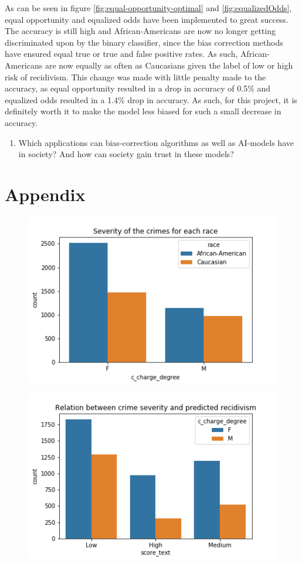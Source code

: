 \documentclass[11pt, fleqn, titlepage]{article}
\begin{document}
	As can be seen in figure \ref{fig:equal-opportunity-optimal} and \ref{fig:equalizedOdds}, equal opportunity and equalized odds have been implemented to great success. The accuracy is still high and African-Americans are now no longer getting discriminated upon by the binary classifier, since the bias correction methods have ensured equal true or true and false positive rates. As such, African-Americans are now equally as often as Caucasians given the label of low or high risk of recidivism. This change was made with little penalty made to the accuracy, as equal opportunity resulted in a drop in accuracy of 0.5\% and equalized odds resulted in a 1.4\% drop in accuracy. As such, for this project, it is definitely worth it to make the model less biased for such a small decrease in accuracy. 
	
	\begin{enumerate}	
		\item Which applications can bias-correction algorithms as well as AI-models have in society? And how can society gain trust in these models? 
	\end{enumerate}
	
	\section{Appendix} \label{appendix}
	
	\begin{figure}[H]
		\centering
		\includegraphics[width=0.5\linewidth]{imgs/c_charge_degree}
		\caption{}
		\label{fig:cchargedegree}
	\end{figure}
	
	\begin{figure}[H]
		\centering
		\includegraphics[width=0.5\linewidth]{imgs/charge_degree_score}
		\caption{}
		\label{fig:chargedegreescore}
	\end{figure}
\end{document}
